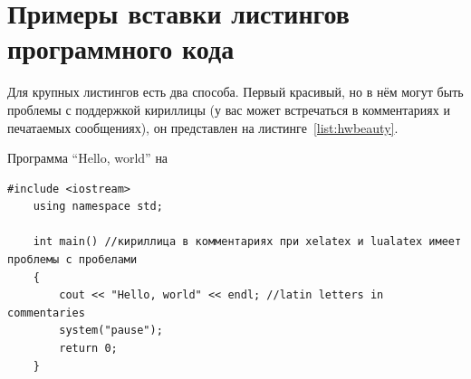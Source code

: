 \chapter{Примеры вставки листингов программного кода} \label{AppendixC}

Для крупных листингов есть два способа. Первый красивый, но в нём могут быть проблемы с поддержкой кириллицы (у вас может встречаться в комментариях и
печатаемых сообщениях), он представлен на листинге~\ref{list:hwbeauty}.
\begin{ListingEnv}[H]%
    \caption{Программа “Hello, world” на \protect\cpp}
    \label{list:hwbeauty}
    \begin{lstlisting}[language={[ISO]C++}]
	#include <iostream>
	using namespace std;

	int main() //кириллица в комментариях при xelatex и lualatex имеет проблемы с пробелами
	{
		cout << "Hello, world" << endl; //latin letters in commentaries
		system("pause");
		return 0;
	}
    \end{lstlisting}
\end{ListingEnv}%
%        
%        
%
%
